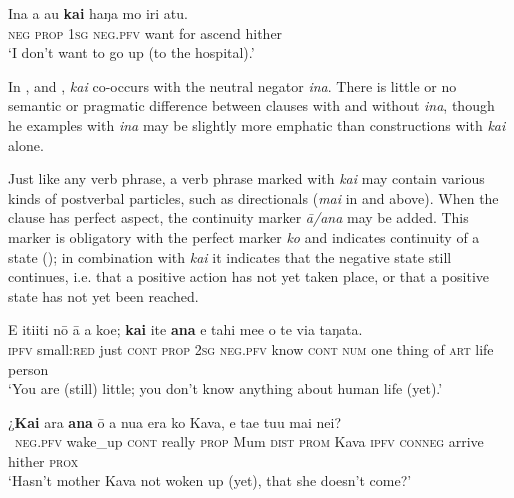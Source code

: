 \ea\label{ex:10.122}
\gll {\ꞌ}Ina a au \textbf{kai} haŋa mo iri atu. \\
\textsc{neg} \textsc{prop} \textsc{1sg} \textsc{neg.pfv} want for ascend hither \\

\glt 
‘I don’t want to go up (to the hospital).’ \textstyleExampleref{[R162.023]} 
\z

In ,  and , \textit{kai} co-occurs with the neutral negator \textit{{\ꞌ}ina}. There is little or no semantic or pragmatic difference between clauses with and without \textit{{\ꞌ}ina}, though he examples with \textit{{\ꞌ}ina} may be slightly more emphatic than constructions with \textit{kai} alone.

Just like any verb phrase, a verb phrase marked with \textit{kai} may contain various kinds of postverbal particles, such as directionals (\textit{mai} in  and  above). When the clause has perfect aspect, the continuity marker \textit{{\ꞌ}ā/{\ꞌ}ana} may be added. This marker is obligatory with the perfect marker \textit{ko} and indicates continuity of a state (); in combination with \textit{kai} it indicates that the negative state still continues, i.e. that a positive action has not yet taken place, or that a positive state has not yet been reached.

\ea\label{ex:10.123}
\gll E {\ꞌ}iti{\ꞌ}iti nō {\ꞌ}ā a koe; \textbf{kai} {\ꞌ}ite \textbf{{\ꞌ}ana} e tahi me{\ꞌ}e  o te via taŋata.\\
\textsc{ipfv} small:\textsc{red} just \textsc{cont} \textsc{prop} \textsc{2sg} \textsc{neg.pfv} know \textsc{cont} \textsc{num} one thing  of \textsc{art} life person\\

\glt 
‘You are (still) little; you don’t know anything about human life (yet).’ \textstyleExampleref{[R210.052]} 
\z

\ea\label{ex:10.124}
\gll ¿\textbf{Kai} {\ꞌ}ara \textbf{{\ꞌ}ana} {\ꞌ}ō a nua era ko Kava, e ta{\ꞌ}e tu{\ꞌ}u mai nei?\\
~\textsc{neg.pfv} wake\_up \textsc{cont} really \textsc{prop} Mum \textsc{dist} \textsc{prom} Kava \textsc{ipfv} \textsc{conneg} arrive hither \textsc{prox}\\

\glt 
‘Hasn’t mother Kava not woken up (yet), that she doesn’t come?’ \textstyleExampleref{[R229.359]}\textstyleExampleref{} 
\z
{}
